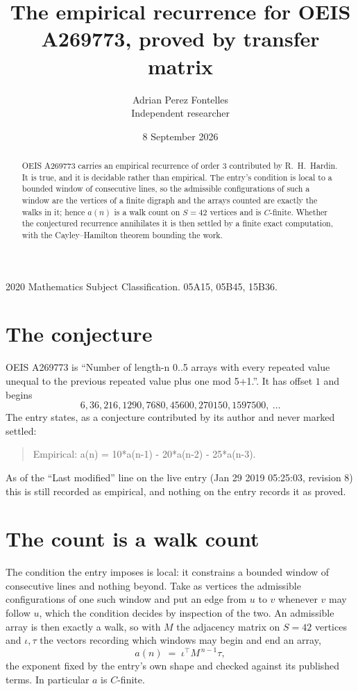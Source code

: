 \documentclass[11pt,a4paper]{article}
\title{The empirical recurrence for OEIS A269773, proved by transfer matrix}
\author{Adrian Perez Fontelles\\ \small Independent researcher}
\date{8 September 2026}
\theoremstyle{plain}
\theoremstyle{definition}
\begin{document}
\maketitle

\begin{abstract}
OEIS A269773 carries an empirical recurrence of order $3$ contributed by R.~H.~Hardin. It is
true, and it is decidable rather than empirical. The entry's condition is local to a bounded window of consecutive lines, so
the admissible configurations of such a window are the vertices of a finite digraph and the
arrays counted are exactly the walks in it; hence $a(n)$ is a walk count on $S=42$ vertices
and is $C$-finite. Whether the conjectured recurrence annihilates it is then settled by a
finite exact computation, with the Cayley--Hamilton theorem bounding the work.
\end{abstract}

\noindent\small 2020 Mathematics Subject Classification. 05A15, 05B45, 15B36.\normalsize

\section{The conjecture}

OEIS A269773 is ``Number of length-n 0..5 arrays with every repeated value unequal to the previous repeated value plus one mod 5+1.''. It has offset $1$ and begins
\[
6, 36, 216, 1290, 7680, 45600, 270150, 1597500,\ \dots
\]
The entry states, as a conjecture contributed by its author and never marked settled:
\begin{quote}
Empirical: a(n) = 10*a(n-1) - 20*a(n-2) - 25*a(n-3).
\end{quote}
As of the ``Last modified'' line on the live entry (Jan 29 2019 05:25:03, revision 8) this is still
recorded as empirical, and nothing on the entry records it as proved.

\section{The count is a walk count}

The condition the entry imposes is local: it constrains a bounded window of consecutive lines and nothing beyond. Take as
vertices the admissible configurations of one such window and put an edge from $u$ to $v$
whenever $v$ may follow $u$, which the condition decides by inspection of the two. An
admissible array is then exactly a walk, so with $M$ the adjacency matrix on $S=42$ vertices
and $\iota,\tau$ the vectors recording which windows may begin and end an array,
\[
a(n)\;=\;\iota^{\!\top}M^{\,n-1}\tau ,
\]
the exponent fixed by the entry's own shape and checked against its published terms. In
particular $a$ is $C$-finite.
\end{document}

